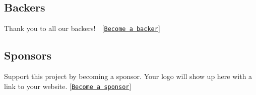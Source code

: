\subsection*{Backers}

Thank you to all our backers! 🙏 \mbox{[}\href{https://opencollective.com/arest#backer}{\tt Become a backer}\mbox{]}

\href{https://opencollective.com/arest#backers}{\tt }

\subsection*{Sponsors}

Support this project by becoming a sponsor. Your logo will show up here with a link to your website. \mbox{[}\href{https://opencollective.com/arest#sponsor}{\tt Become a sponsor}\mbox{]}

\href{https://opencollective.com/arest/sponsor/0/website}{\tt } \href{https://opencollective.com/arest/sponsor/1/website}{\tt } \href{https://opencollective.com/arest/sponsor/2/website}{\tt } \href{https://opencollective.com/arest/sponsor/3/website}{\tt } \href{https://opencollective.com/arest/sponsor/4/website}{\tt } \href{https://opencollective.com/arest/sponsor/5/website}{\tt } \href{https://opencollective.com/arest/sponsor/6/website}{\tt } \href{https://opencollective.com/arest/sponsor/7/website}{\tt } \href{https://opencollective.com/arest/sponsor/8/website}{\tt } \href{https://opencollective.com/arest/sponsor/9/website}{\tt } 